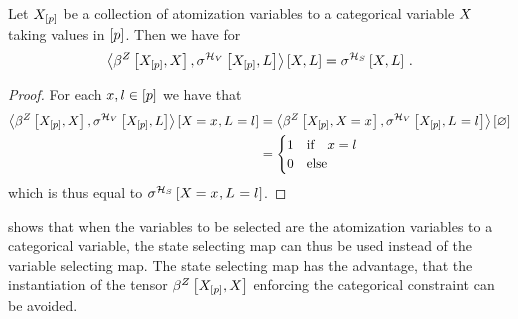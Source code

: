\begin{lemma}
    \label{lem:stateSelectorVsVariableSelector}
    Let $X_{[p]}$ be a collection of atomization variables to a categorical variable $X$ taking values in $[p]$.
    Then we have for
    \begin{align*}
        \left\langle \beta^{Z}\left[X_{[p]},X\right],
            \sigma^{\mathcal{H}_{V}}\left[X_{[p]},L\right]
        \right\rangle \left[ X,L \right]
        =
        \sigma^{\mathcal{H}_{S}}\left[X,L\right] \, .
    \end{align*}
\end{lemma}
\begin{proof}
    For each $x,l\in[p]$ we have that
    \begin{align*}
        \left\langle \beta^{Z}\left[X_{[p]},X\right],
            \sigma^{\mathcal{H}_{V}}\left[X_{[p]},L\right]
        \right\rangle \left[ X_{}=x_{},L_{}=l_{} \right]
        &=
        \left\langle \beta^{Z}\left[X_{[p]},X_{}=x_{}\right],
            \sigma^{\mathcal{H}_{V}}\left[X_{[p]},L_{}=l_{}\right]
        \right\rangle \left[ \varnothing \right] \\
        &= \begin{cases}
               1 & \text{if} \quad x = l \\
               0 & \text{else}
        \end{cases}
    \end{align*}
    which is thus equal to $\sigma^{\mathcal{H}_{S}}\left[X_{}=x_{},L_{}=l_{}\right]$.
\end{proof}

 shows that when the variables to be selected are the atomization variables to a categorical variable, the state selecting map can thus be used instead of the variable selecting map.
The state selecting map has the advantage, that the instantiation of the tensor $\beta^{Z}\left[X_{[p]},X\right]$ enforcing the categorical constraint can be avoided.


